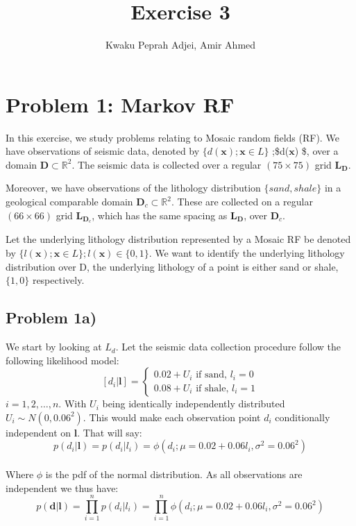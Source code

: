 \documentclass[]{article}
\title{Exercise 3}
\author{Kwaku Peprah Adjei, Amir Ahmed}
\date{}
\newcommand{\vect}[1]{\ensuremath{\boldsymbol{\mathbf{#1}}}}
\begin{document}
\maketitle

\hypertarget{problem-1-markov-rf}{%
\section{Problem 1: Markov RF}\label{problem-1-markov-rf}}

In this exercise, we study problems relating to Mosaic random fields
(RF). We have observations of seismic data, denoted by
\(\lbrace d(\vect x); \vect x \in L \rbrace\) ;\$d(\vect x)
\in {} \$, over a domain \(\mathbf{D} \subset \mathbb{R}^2\).
The seismic data is collected over a regular \((75 \times 75)\) grid
\(\mathbf{L}_\mathbf{D}\).

Moreover, we have observations of the lithology distribution
\(\{sand, shale\}\) in a geological comparable domain
\(\mathbf{D}_c \subset \mathbb{R}^2\). These are collected on a regular
\((66 \times 66)\) grid \(\mathbf{L}_{\mathbf{D}_c}\), which has the
same spacing as \(\mathbf{L}_\mathbf{D}\), over \(\mathbf{D}_c\).

Let the underlying lithology distribution represented by a Mosaic RF be
denoted by
\(\lbrace l(\vect x); \vect x \in L \rbrace ;l(\vect x) \in \{0,1 \}\).
We want to identify the underlying lithology distribution over D, the
underlying lithology of a point is either sand or shale,
\(\lbrace 1, 0 \rbrace\) respectively.

\hypertarget{problem-1a}{%
\subsection{Problem 1a)}\label{problem-1a}}

We start by looking at \(L_d\). Let the seismic data collection
procedure follow the following likelihood model:
\[\left[d_i | \vect l \right] = \begin{cases}
0.02 + U_i \text{ if sand, } l_i = 0 \\
0.08 + U_i \text{ if shale, } l_i = 1
\end{cases}\] \(i = 1, 2, \dots, n\). With \(U_i\) being identically
independently distributed \(U_i \sim N(0, 0.06^2)\). This would make
each observation point \(d_i\) conditionally independent on \(\vect l\).
That will say: \begin{equation}
p(d_i | \vect l) = p(d_i | l_i) = \phi(d_i  ; \mu = 0.02 + 0.06l_i, \sigma^2 = 0.06^2)
\end{equation}\\
Where \(\phi\) is the pdf of the normal distribution. As all
observations are independent we thus have:
\begin{equation}\label{eq:cond_prob}
 p(\vect d | \vect l) = \prod_{i=1}^{n}p(d_i | l_i) = \prod_{i=1}^{n}  \phi(d_i  ; \mu = 0.02 + 0.06l_i, \sigma^2 = 0.06^2)
\end{equation}
\end{document}

